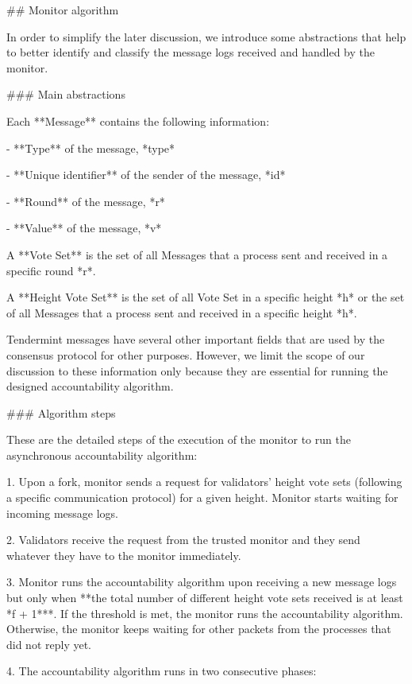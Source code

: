 \documentclass[a4paper,11pt,oneside]{report}
\begin{document}
\begin{markdown}

## Monitor algorithm

In order to simplify the later discussion, we introduce some abstractions that help to better identify and classify the message logs received and handled by the monitor.

### Main abstractions

Each **Message** contains the following information:

- **Type** of the message, *type*

- **Unique identifier** of the sender of the message, *id*

- **Round** of the message, *r*

- **Value** of the message, *v*

A **Vote Set** is the set of all Messages that a process sent and received in a specific round *r*.

A **Height Vote Set** is the set of all Vote Set in a specific height *h* or the set of all Messages that a process sent and received in a specific height *h*.

Tendermint messages have several other important fields that are used by the consensus protocol for other purposes. However, we limit the scope of our discussion to these information only because they are essential for running the designed accountability algorithm.       

### Algorithm steps
 
These are the detailed steps of the execution of the monitor to run the asynchronous accountability algorithm: 
 
1. Upon a fork, monitor sends a request for validators' height vote sets (following a specific communication protocol) for a given height. Monitor starts waiting for incoming message logs.

2. Validators receive the request from the trusted monitor and they send whatever they have to the monitor immediately. 

3. Monitor runs the accountability algorithm upon receiving a new message logs but only when **the total number of different height vote sets received is at least *f + 1***. 
If the threshold is met, the monitor runs the accountability algorithm. Otherwise, the monitor keeps waiting for other packets from the processes that did not reply yet. 
      
4. The accountability algorithm runs in two consecutive phases:


\end{markdown}
\end{document}
